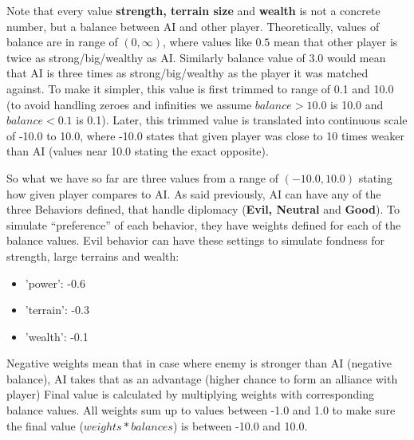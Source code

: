\begin{par}
	Note that every value \textbf{strength, terrain size} and \textbf{wealth} is not a concrete number, but a balance between AI and other player.
	Theoretically, values of balance are in range of $(0, \infty)$, where values like $0.5$ mean that other player is twice as strong/big/wealthy as AI. 
	Similarly balance value of $3.0$ would mean that AI is three times as strong/big/wealthy as the player it was matched against. 
	To make it simpler, this value is first trimmed to range of 0.1 and 10.0 (to avoid handling zeroes and infinities we assume $balance > 10.0$ is 10.0 and $balance < 0.1$ is 0.1).
	Later, this trimmed value is translated into continuous scale of -10.0 to 10.0, where -10.0 states that given player was close to 10 times weaker than AI (values near 10.0 stating the exact opposite).
\end{par}
\begin{par}
	So what we have so far are three values from a range of $(-10.0, 10.0)$ stating how given player compares to AI.
	As said previously, AI can have any of the three Behaviors defined, that handle diplomacy (\textbf{Evil, Neutral} and \textbf{Good}). To simulate ``preference'' of each behavior, they have weights defined for each of the balance values.
	Evil behavior can have these settings to simulate fondness for strength, large terrains and wealth:
	\begin{itemize}
		\item 'power': -0.6
		\item 'terrain': -0.3
		\item 'wealth': -0.1
	\end{itemize}
	Negative weights mean that in case where enemy is stronger than AI (negative balance), AI takes that as an advantage (higher chance to form an alliance with player)
	Final value is calculated by multiplying weights with corresponding balance values. All weights sum up to values between -1.0 and 1.0 to make sure the final value ($weights * balances$) is between -10.0 and 10.0.
\end{par}

